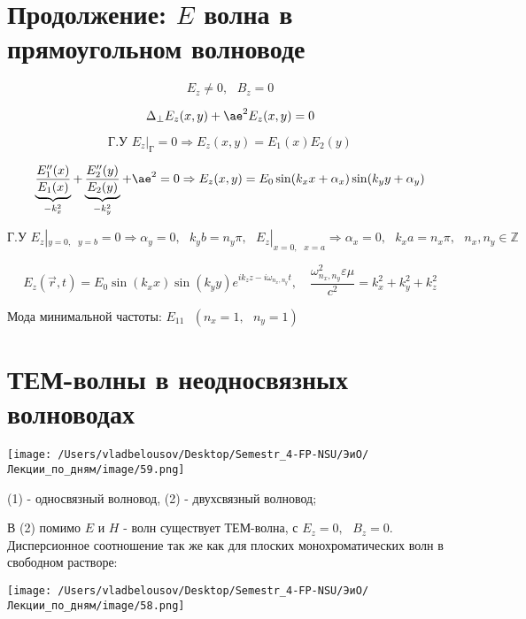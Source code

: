 \documentclass[12pt, a4paper]{report}
\begin{document}
\fi



\section{Продолжение: \( E \) волна в прямоугольном волноводе }

\[ E_z \neq 0 , \text{ } B_z = 0 \] 

\[ \Delta_{ \perp  } E_z ( x,y ) + \ae ^2 E_z (x,y )= 0  \] 

\[ \text{Г.У } E_z|_{\text{Г} } = 0 \Rightarrow E_z (x,y ) = E_1 (x) E_2 (y )  \] 

\[ \underbrace{\frac{E_1 '' (x )}{E_1 (x ) }}_{-k_x ^2 } + \underbrace{\frac{ E_2 ''(y )}{E_2 (y )}}_{- k_y ^2 } + \ae ^2 = 0 \Rightarrow E_z (x,y) = E_0 \sin (k_x x + \alpha_x ) \sin (k_y y + \alpha_y)   \] 

\[ \text{Г.У } E_z |_{y= 0 , \text{ }  y = b } = 0 \Rightarrow \alpha_y = 0 , \text{ } k_y b = n_y \pi , \text{ }  E_z |_{x= 0 , \text{ } x =a  }  \Rightarrow \alpha_x = 0 , \text{ } k_x a = n_x \pi ,  \text{ } n_x ,n_y \in \mathbb{Z}  \] 

\[ E_z (\vec{r } ,  t ) = E_0 \sin (k_x x) \sin (k_y y )e^{ i k_z z - i \omega_{n_x, n_y } t } , \quad  \frac{\omega_{n_x, n_y } ^2  \varepsilon \mu}{c ^2} = k_x ^2 + k_y ^2 + k_z ^2    \] 

Мода минимальной частоты: \( E_{11}     \text{ } (n_x = 1, \text{  } n_y= 1 ) \) 

\section{ТЕМ-волны в неодносвязных волноводах }

\begin{center}
    \texttt{[image: /Users/vladbelousov/Desktop/Semestr\_4-FP-NSU/ЭиО/Лекции\_по\_дням/image/59.png]}
\end{center}

\begin{center}
    (1) - односвязный волновод, (2) - двухсвязный волновод;
\end{center}

В (2) помимо \( E \) и \( H  \) - волн существует ТЕМ-волна, с \( E_z = 0, \text{ } B_z = 0 \). Дисперсионное соотношение так же как для плоских монохроматических волн в свободном растворе: 

\begin{center}
    \texttt{[image: /Users/vladbelousov/Desktop/Semestr\_4-FP-NSU/ЭиО/Лекции\_по\_дням/image/58.png]}
\end{center}
\end{document}

